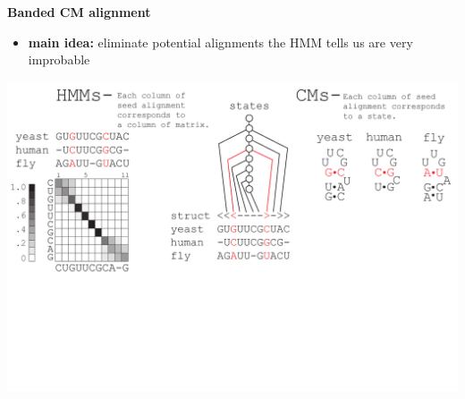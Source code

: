\documentclass[landscape]{slides}
\begin{document}
\begin{slide}
\begin{center}
\large
\textbf{Banded CM alignment}
\end{center}
\medskip
\small
\begin{itemize}
\item
\textbf{main idea:} eliminate potential alignments the HMM tells us are very improbable
\end{itemize}
\begin{center}
\includegraphics[width=8in]{figs/post_hmm_to_cm_map2_layer9}
\end{center}
\vfill
\end{slide}
\end{document}
